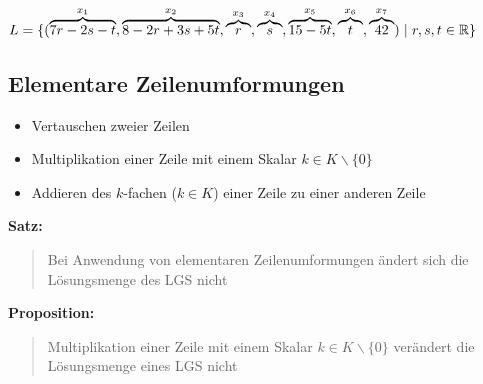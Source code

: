\documentclass{article}
\newcommand{\smsp}{\phantom{\hspace{3px}}}
\newcommand{\dgr}[1]{\textcolor{dgr}{#1}}
\newcommand{\prop}[1]{\dgr{\textbf{Proposition: }}\begin{quote}#1\end{quote}}
\newcommand{\se}[1]{\dgr{\textbf{Satz: }}\begin{quote}#1\end{quote}}
\newcommand{\R}{\mathbb{R}}
\renewcommand{\st}{\smsp | \smsp}
\begin{document}
$L = \{(\overbrace{7r-2s-t}^{x_1},\overbrace{8-2r+3s+5t}^{x_2},\overbrace{r}^{x_3},\overbrace{s}^{x_4},\overbrace{15-5t}^{x_5},\overbrace{t}^{x_6},\overbrace{42}^{x_7}) \st r,s,t \in \R\}$

\subsection{Elementare Zeilenumformungen}

\begin{itemize}
    \item Vertauschen zweier Zeilen
    \item Multiplikation einer Zeile mit einem Skalar $k \in K \backslash \{0\}$
    \item Addieren des $k$-fachen ($k \in K$) einer Zeile zu einer anderen Zeile
\end{itemize}

\se{Bei Anwendung von elementaren Zeilenumformungen ändert sich die Lösungsmenge des LGS nicht}

\prop{Multiplikation einer Zeile mit einem Skalar $k \in K \backslash \{0\}$ verändert die Lösungsmenge eines LGS nicht}
\end{document}
